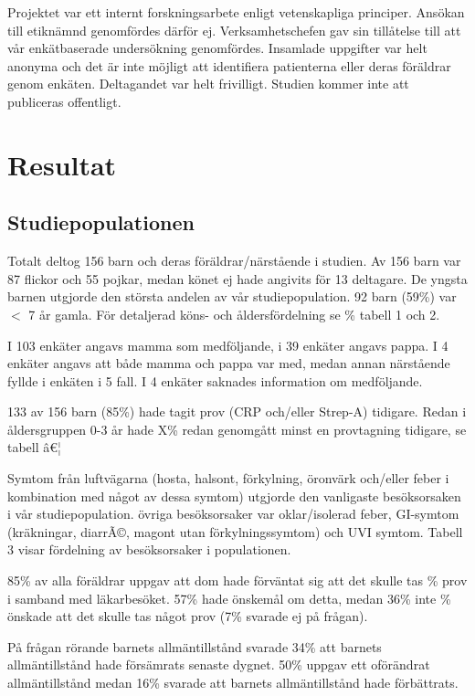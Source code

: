 \documentclass[12pt,twocolumn]{article}
\begin{document}
Projektet var ett internt forskningsarbete enligt vetenskapliga principer.
Ans\"okan till etikn\"amnd genomf\"ordes d\"arf\"or ej. Verksamhetschefen gav
sin till\r{a}telse till att v\r{a}r enk\"atbaserade unders\"okning
genomf\"ordes. Insamlade uppgifter var helt anonyma och det \"ar inte m\"ojligt
att identifiera patienterna eller deras f\"or\"aldrar genom enk\"aten.
Deltagandet var helt frivilligt. Studien kommer inte att publiceras offentligt.

\section{Resultat}

\subsection{Studiepopulationen}
Totalt deltog 156 barn och deras f\"or\"aldrar/n\"arst\r{a}ende i studien. Av
156 barn var 87 flickor och 55 pojkar, medan k\"onet ej hade angivits f\"or 13
deltagare. De yngsta barnen utgjorde den st\"orsta andelen av v\r{a}r
studiepopulation. 92 barn (59\%) var $<$ 7 \r{a}r gamla. F\"or detaljerad
k\"ons- och \r{a}ldersf\"ordelning se \% tabell 1 och 2.

I 103 enk\"ater angavs mamma som medf\"oljande, i 39 enk\"ater angavs pappa. I 4
enk\"ater angavs att b\r{a}de mamma och pappa var med, medan annan
n\"arst\r{a}ende fyllde i enk\"aten i 5 fall. I 4 enk\"ater  saknades
information om medf\"oljande.

133 av 156 barn (85\%) hade tagit prov (CRP och/eller Strep-A) tidigare. Redan i
\r{a}ldersgruppen 0-3 \r{a}r hade X\% redan genomg\r{a}tt minst en provtagning
tidigare, se tabell â€¦

Symtom fr\r{a}n luftv\"agarna (hosta, halsont, f\"orkylning, \"oronv\"ark
och/eller feber i kombination med n\r{a}got av dessa symtom) utgjorde den
vanligaste bes\"oksorsaken i v\r{a}r studiepopulation. \"ovriga bes\"oksorsaker
var oklar/isolerad feber, GI-symtom (kr\"akningar, diarrÃ©, magont utan
f\"orkylningssymtom) och UVI symtom. Tabell 3 visar f\"ordelning av
bes\"oksorsaker i populationen.

85\% av alla f\"or\"aldrar uppgav att dom hade f\"orv\"antat sig att det skulle
tas \% prov i samband med l\"akarbes\"oket. 57\% hade \"onskem\r{a}l om detta,
medan 36\% inte \% \"onskade att det skulle tas n\r{a}got prov (7\% svarade ej
p\r{a} fr\r{a}gan).

P\r{a} fr\r{a}gan r\"orande barnets allm\"antillst\r{a}nd svarade 34\% att
barnets allm\"antillst\r{a}nd hade f\"ors\"amrats senaste dygnet. 50\% uppgav
ett of\"or\"andrat allm\"antillst\r{a}nd medan 16\% svarade att barnets
allm\"antillst\r{a}nd hade f\"orb\"attrats.
\end{document}
